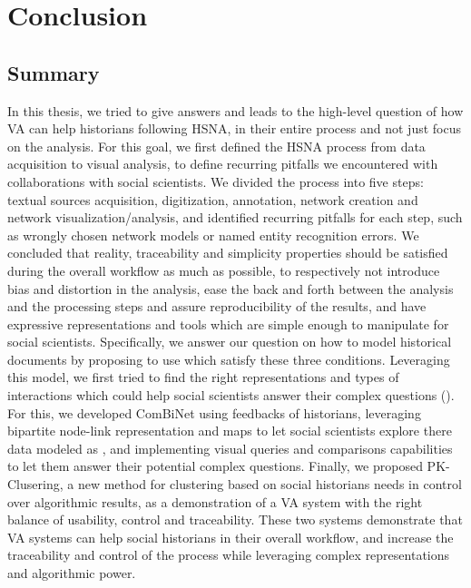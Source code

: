 \chapter{Conclusion}




\section{Summary}

In this thesis, we tried to give answers and leads to the high-level question of how VA can help historians following HSNA, in their entire process and not just focus on the analysis.
For this goal, we first defined the HSNA process from data acquisition to visual analysis, to define recurring pitfalls we encountered with collaborations with social scientists.
We divided the process into five steps: textual sources acquisition, digitization, annotation, network creation and network visualization/analysis, and identified recurring pitfalls for each step, such as wrongly chosen network models or named entity recognition errors.
We concluded that reality, traceability and simplicity properties should be satisfied during the overall workflow as much as possible, to respectively not introduce bias and distortion in the analysis, ease the back and forth between the analysis and the processing steps and assure reproducibility of the results, and have expressive representations and tools which are simple enough to manipulate for social scientists.
Specifically, we answer our question \qone on how to model historical documents by proposing to use \modelplural which satisfy these three conditions.
Leveraging this model, we first tried to find the right representations and types of interactions which could help social scientists answer their complex questions (\qtwo).
For this, we developed ComBiNet using feedbacks of historians, leveraging bipartite node-link representation and maps to let social scientists explore there data modeled as \modelplural, and implementing visual queries and comparisons capabilities to let them answer their potential complex questions.
Finally, we proposed PK-Clusering, a new method for clustering based on social historians needs in control over algorithmic results, as a demonstration of a VA system with the right balance of usability, control and traceability.
These two systems demonstrate that VA systems can help social historians in their overall workflow, and increase the traceability and control of the process while leveraging complex representations and algorithmic power.


